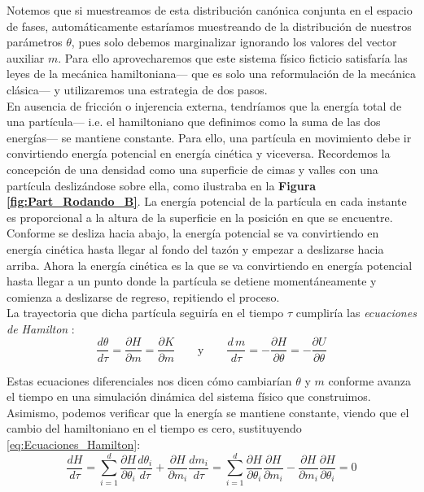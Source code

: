  Notemos que si muestreamos de esta distribución canónica conjunta en el espacio de fases, automáticamente estaríamos muestreando de la distribución de nuestros parámetros $\theta$, pues solo debemos marginalizar ignorando los valores del vector auxiliar $m$. Para ello aprovecharemos que este sistema físico ficticio satisfaría las leyes de la mecánica hamiltoniana--- que es solo una reformulación de la mecánica clásica--- y utilizaremos una estrategia de dos pasos.\\ 
 
 En ausencia de fricción o injerencia externa, tendríamos que la energía total de una partícula--- i.e. el hamiltoniano que definimos como la suma de las dos energías--- se mantiene constante. Para ello, una partícula en movimiento debe ir convirtiendo energía potencial en energía cinética y viceversa. Recordemos la concepción de una densidad como una superficie de cimas y valles con una partícula deslizándose sobre ella, como ilustraba en la \textbf{Figura \ref{fig:Part_Rodando_B}}. La energía potencial de la partícula en cada instante es proporcional a la altura de la superficie en la posición en que se encuentre. Conforme se desliza hacia abajo, la energía potencial se va convirtiendo en energía cinética hasta llegar al fondo del tazón y empezar a deslizarse hacia arriba. Ahora la energía cinética es la que se va convirtiendo en energía potencial hasta llegar a un punto donde la partícula se detiene momentáneamente y comienza a deslizarse de regreso, repitiendo el proceso.\\ 
 
 La trayectoria que dicha partícula seguiría en el tiempo $\tau$ cumpliría las \textit{ecuaciones de Hamilton} \parencites{Neal93,Neal11,Betancourt17}: 
 \begin{equation}
 \label{eq:Ecuaciones_Hamilton}
 \dfrac{d\theta}{d\tau}=\dfrac{\partial H}{\partial m} = \dfrac{\partial K}{\partial m} \qquad \text{y} \qquad \dfrac{d\,m}{d\tau}=-\dfrac{\partial H}{\partial \theta} = -\dfrac{\partial U}{\partial \theta}
 \end{equation}
 
 Estas ecuaciones diferenciales nos dicen cómo cambiarían $\theta$ y $m$ conforme avanza el tiempo en una simulación dinámica del sistema físico que construimos. Asimismo, podemos verificar que la energía se mantiene constante, viendo que el cambio del hamiltoniano en el tiempo es cero, sustituyendo \eqref{eq:Ecuaciones_Hamilton}:
 \begin{equation*}
 \dfrac{dH}{d\tau} = \sum\limits_{i=1}^d \dfrac{\partial H}{\partial \theta_i}\dfrac{d\theta_i}{d\tau} + \dfrac{\partial H}{\partial m_i}\dfrac{dm_i}{d\tau} = \sum\limits_{i=1}^d \dfrac{\partial H}{\partial \theta_i}\dfrac{\partial H}{\partial m_i} - \dfrac{\partial H}{\partial m_i}\dfrac{\partial H}{\partial \theta_i} = 0
 \end{equation*}
 
